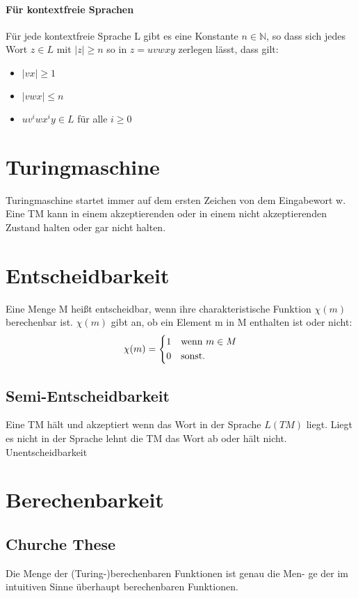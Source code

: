 \documentclass[a4paper]{scrartcl}
\begin{document}
		
		\paragraph{Für kontextfreie Sprachen}
		Für jede kontextfreie Sprache L gibt es eine Konstante \( n \in \mathbb{N} \), so dass
		sich jedes Wort \( z \in L \) mit \( |z| \geq n \) so in \(z = uvwxy\) zerlegen lässt, dass
		gilt:
		\begin{itemize}
			\item \(|vx| \geq 1\)
			\item \(|vwx| \leq n\) 
			\item \( uv^i wx^i y \in L \) für alle \( i \geq 0 \)
		\end{itemize}
	
	\section{Turingmaschine}
	Turingmaschine startet immer auf dem ersten Zeichen von dem Eingabewort w. \\
	Eine TM kann in einem akzeptierenden oder in einem nicht akzeptierenden Zustand halten oder gar nicht halten.\\
	
	\section{Entscheidbarkeit}
		Eine Menge M heißt entscheidbar, wenn ihre charakteristische
		Funktion \(\chi(m)\) berechenbar ist. \(\chi(m)\) gibt an, ob ein Element m in M enthalten ist oder nicht:
		\[
			\chi(m) = \begin{dcases*}
			1  & wenn \(m \in M\)\\
			0 & sonst.
			\end{dcases*}
		\]
		\subsection{Semi-Entscheidbarkeit}
		Eine TM hält und akzeptiert wenn das Wort in der Sprache \(L(TM)\) liegt. Liegt es nicht in der Sprache lehnt die TM das Wort ab oder hält nicht.\\
		Unentscheidbarkeit\\
		
		
	\section{Berechenbarkeit}
		\subsection{Churche These}
		Die Menge der (Turing-)berechenbaren Funktionen ist genau die Men-
		ge der im intuitiven Sinne überhaupt berechenbaren Funktionen.
		
\end{document}
